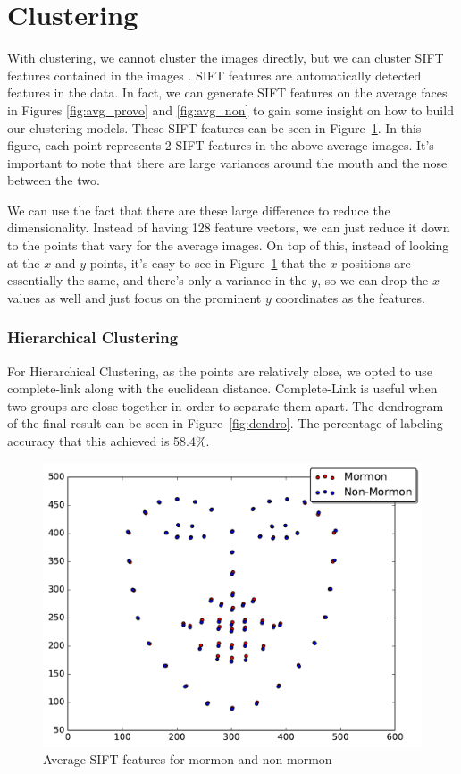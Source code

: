 \documentclass{article}
\begin{document}
\section*{Clustering}

With clustering, we cannot cluster the images directly, but we can cluster SIFT features contained in the images \cite{SIFT}. SIFT features are automatically detected features in the data. In fact, we can generate SIFT features on the average faces in Figures \ref{fig:avg_provo} and \ref{fig:avg_non} to gain some insight on how to build our clustering models. These SIFT features can be seen in Figure~\ref{fig:sift_avg}. In this figure, each point represents 2 SIFT features in the above average images. It's important to note that there are large variances around the mouth and the nose between the two.

We can use the fact that there are these large difference to reduce the dimensionality. Instead of having 128 feature vectors, we can just reduce it down to the points that vary for the average images. On top of this, instead of looking at the $x$ and $y$ points, it's easy to see in Figure~\ref{fig:sift_avg} that the $x$ positions are essentially the same, and there's only a variance in the $y$, so we can drop the $x$ values as well and just focus on the prominent $y$ coordinates as the features.

\subsubsection*{Hierarchical Clustering}

For Hierarchical Clustering, as the points are relatively close, we opted to use complete-link along with the euclidean distance. Complete-Link is useful when two groups are close together in order to separate them apart. The dendrogram of the final result can be seen in Figure~\ref{fig:dendro}. The percentage of labeling accuracy that this achieved is 58.4\%. 

\begin{figure}
\centering
\includegraphics[width=.65\linewidth]{data/average_sift.pdf}
\caption{Average SIFT features for mormon and non-mormon}
\label{fig:sift_avg}
\end{figure}
\end{document}

